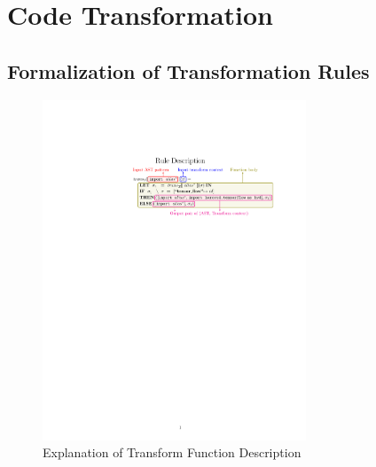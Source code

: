 \section{Code Transformation}\label{sec:trans}

\subsection{Formalization of Transformation Rules}

\begin{figure}[ht!]
    \centering
    \includegraphics[width=0.7\textwidth]{transfn_expl.pdf}
    \caption{Explanation of Transform Function Description}
    \label{fig:trans:fnexpl}
\end{figure}

